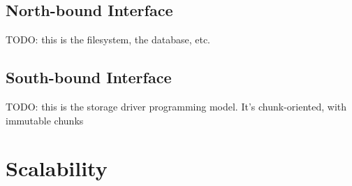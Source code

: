 \subsection{North-bound Interface}

TODO: this is the filesystem, the database, etc.

\subsection{South-bound Interface}

TODO: this is the storage driver programming model.  It's chunk-oriented, with
immutable chunks

\section{Scalability}






